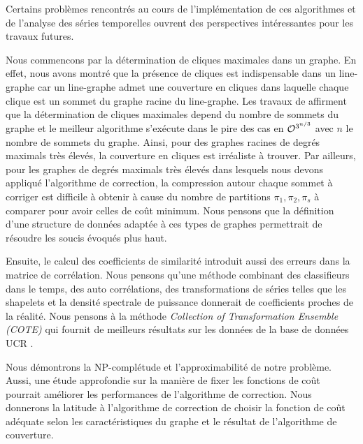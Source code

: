 Certains probl\`emes rencontr\'es au cours de l'impl\'ementation de ces algorithmes et de l'analyse des s\'eries temporelles ouvrent des perspectives int\'eressantes pour les travaux futures.
\newline 

Nous commencons par la d\'etermination de cliques maximales dans un graphe. En effet, nous avons montr\'e que la pr\'esence de cliques est indispensable dans un line-graphe car un line-graphe admet une couverture en cliques dans laquelle chaque clique est un sommet du graphe racine du line-graphe. 
Les travaux de \cite{tomita2006worst, eppstein2011listing} affirment que la d\'etermination de cliques maximales depend du nombre de sommets du graphe et le meilleur algorithme s'ex\'ecute dans le pire des cas en ${\cal O}^{3^{n/3}}$ avec $n$ le nombre de sommets du graphe. 
Ainsi, pour des graphes racines de degr\'es maximals tr\`es \'elev\'es, la couverture en cliques est irr\'ealiste \`a trouver.  
Par ailleurs, pour les graphes de degr\'es maximals tr\`es \'elev\'es dans lesquels nous devons appliqu\'e l'algorithme de correction, la compression autour chaque sommet \`a corriger est difficile \`a obtenir \`a cause du nombre de partitions $\pi_1, \pi_2, \pi_s$ \`a comparer pour avoir celles de co\^ut minimum. 
Nous pensons que la d\'efinition d'une structure de donn\'ees adapt\'ee \`a ces types de graphes permettrait de r\'esoudre les soucis \'evoqu\'es plus haut.
\newline

Ensuite, le calcul des coefficients de similarit\'e introduit aussi des erreurs dans la matrice de corr\'elation. Nous pensons qu'une m\'ethode combinant des classifieurs dans le temps, des auto corr\'elations, des transformations de s\'eries telles que les shapelets et la densit\'e spectrale de puissance donnerait de coefficients proches de la r\'ealit\'e. Nous pensons \`a la m\'ethode {\em Collection of Transformation Ensemble (COTE)} \cite{bagnall2015time} qui fournit de meilleurs r\'esultats \cite{bagnallreview} sur les donn\'ees de la base de donn\'ees UCR \cite{chen2015ucr}. 
\newline

Nous d\'emontrons la NP-compl\'etude et l'approximabilit\'e de notre probl\`eme. 
Aussi, une \'etude approfondie sur la mani\`ere de fixer les fonctions de co\^ut pourrait am\'eliorer les performances de l'algorithme de correction. Nous donnerons la latitude \`a l'algorithme de correction de choisir la fonction de co\^ut ad\'equate selon les caract\'eristiques du graphe et le r\'esultat de l'algorithme de couverture. 
\newline 

